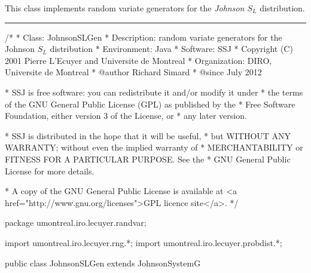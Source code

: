 
This class implements random variate generators for the
{\em Johnson $S_L$\/} distribution.


\bigskip\hrule

\begin{code}
\begin{hide}
/*
 * Class:        JohnsonSLGen
 * Description:  random variate generators for the Johnson $S_L$ distribution
 * Environment:  Java
 * Software:     SSJ
 * Copyright (C) 2001  Pierre L'Ecuyer and Universite de Montreal
 * Organization: DIRO, Universite de Montreal
 * @author       Richard Simard
 * @since        July 2012

 * SSJ is free software: you can redistribute it and/or modify it under
 * the terms of the GNU General Public License (GPL) as published by the
 * Free Software Foundation, either version 3 of the License, or
 * any later version.

 * SSJ is distributed in the hope that it will be useful,
 * but WITHOUT ANY WARRANTY; without even the implied warranty of
 * MERCHANTABILITY or FITNESS FOR A PARTICULAR PURPOSE.  See the
 * GNU General Public License for more details.

 * A copy of the GNU General Public License is available at
   <a href="http://www.gnu.org/licenses">GPL licence site</a>.
 */
\end{hide}
package umontreal.iro.lecuyer.randvar;\begin{hide}
import umontreal.iro.lecuyer.rng.*;
import umontreal.iro.lecuyer.probdist.*;
\end{hide}

public class JohnsonSLGen extends JohnsonSystemG \begin{hide} {
\end{hide}\end{code}

